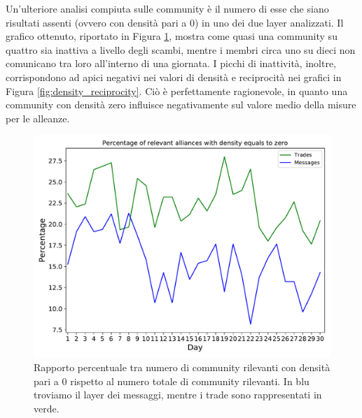 Un'ulteriore analisi compiuta sulle community è il numero di esse che siano risultati assenti (ovvero con densità pari a 0) in uno dei due layer analizzati. Il grafico ottenuto, riportato in Figura \ref{fig:densityzeroper}, mostra come quasi una community su quattro sia inattiva a livello degli scambi, mentre i membri circa uno su dieci non comunicano tra loro all'interno di una giornata. I picchi di inattività, inoltre, corrispondono ad apici negativi nei valori di densità e reciprocità nei grafici in Figura \ref{fig:density_reciprocity}. Ciò è perfettamente ragionevole, in quanto una community con densità zero influisce negativamente sul valore medio della misure per le alleanze.
\begin{figure}
	\centering
	\includegraphics[width=0.9\linewidth]{images/Community/Density_Reciprocity/density_zero_per}
	\caption{Rapporto percentuale tra numero di community rilevanti con densità pari a 0 rispetto al numero totale di community rilevanti. In blu troviamo il layer dei messaggi, mentre i trade sono rappresentati in verde.}
	\label{fig:densityzeroper}
\end{figure}


